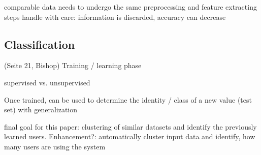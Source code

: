 comparable data needs to undergo the same preprocessing and feature extracting steps
handle with care: information is discarded, accuracy can decrease

\subsection{Classification}
(Seite 21, Bishop)
Training / learning phase

supervised vs. unsupervised

Once trained, can be used to determine the identity / class of a new value (test set) with generalization

final goal for this paper: clustering of similar datasets and identify the previously learned users.
Enhancement?: automatically cluster input data and identify, how many users are using the system